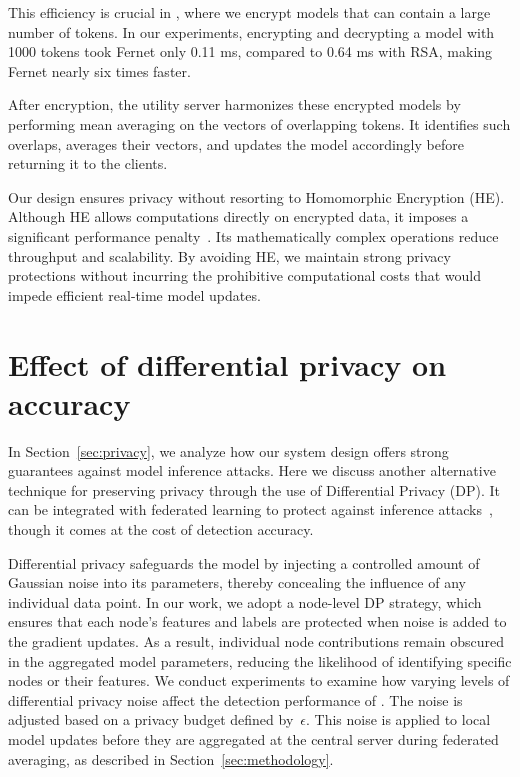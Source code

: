 This efficiency is crucial in \Sys, where we encrypt \wordvec models that can contain a large number of tokens. In our experiments, encrypting and decrypting a \wordvec model with 1000 tokens took Fernet only 0.11 ms, compared to 0.64 ms with RSA, making Fernet nearly six times faster.

After encryption, the utility server harmonizes these encrypted models by performing mean averaging on the vectors of overlapping tokens. It identifies such overlaps, averages their vectors, and updates the model accordingly before returning it to the clients.

Our design ensures privacy without resorting to Homomorphic Encryption (HE). Although HE allows computations directly on encrypted data, it imposes a significant performance penalty~\cite{naehrig2011can}. Its mathematically complex operations reduce throughput and scalability. By avoiding HE, we maintain strong privacy protections without incurring the prohibitive computational costs that would impede efficient real-time model updates.

\section{Effect of differential privacy on accuracy}
\label{app:dp}

In Section~\ref{sec:privacy}, we analyze how our system design offers strong guarantees against model inference attacks. Here we discuss another alternative technique for preserving privacy through the use of Differential Privacy (DP). It can be integrated with federated learning to protect against inference attacks~\cite{lyu2020threats,nasr2019comprehensive,zari2021efficient}, though it comes at the cost of detection accuracy.

Differential privacy safeguards the model by injecting a controlled amount of Gaussian noise into its parameters, thereby concealing the influence of any individual data point. In our work, we adopt a node-level DP strategy, which ensures that each node’s features and labels are protected when noise is added to the gradient updates. As a result, individual node contributions remain obscured in the aggregated model parameters, reducing the likelihood of identifying specific nodes or their features. We conduct experiments to examine how varying levels of differential privacy noise affect the detection performance of \Sys. The noise is adjusted based on a privacy budget defined by~$\epsilon$. This noise is applied to local \gnnshort model updates before they are aggregated at the central server during federated averaging, as described in Section~\ref{sec:methodology}.

